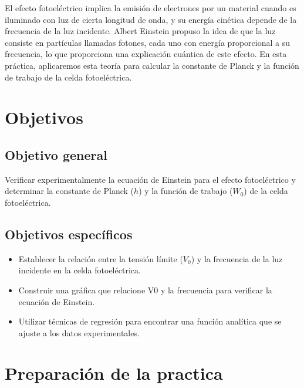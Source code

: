 \documentclass[twocolumn, 12pt]{article}
\begin{document}
El efecto fotoeléctrico implica la emisión de electrones
por un material cuando es iluminado con luz de cierta
longitud de onda, y su energía cinética depende de la
frecuencia de la luz incidente. Albert Einstein propuso la
idea de que la luz consiste en partículas llamadas fotones,
cada uno con energía proporcional a su frecuencia, lo que
proporciona una explicación cuántica de este efecto. En
esta práctica, aplicaremos esta teoría para calcular la
constante de Planck y la función de trabajo de la celda
fotoeléctrica.

\section{Objetivos}

\subsection{Objetivo general}

Verificar experimentalmente la ecuación de Einstein para el
efecto fotoeléctrico y determinar la constante de Planck
($h$) y la función de trabajo ($W_0$) de la celda
fotoeléctrica.

\subsection{Objetivos específicos}

\begin{itemize}[label=$\triangleright$]
      \item Establecer la relación entre la tensión límite ($V_0$) y la
            frecuencia de la luz incidente en la celda fotoeléctrica.

      \item Construir una gráfica que relacione V0 y la frecuencia para
            verificar la ecuación de Einstein.

      \item Utilizar técnicas de regresión para encontrar una función
            analítica que se ajuste a los datos experimentales.
\end{itemize}

\section{Preparación de la practica}
\end{document}
